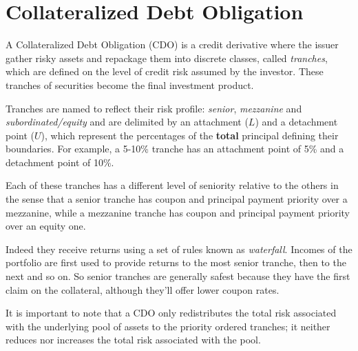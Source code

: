 \section{Collateralized Debt Obligation}\label{collateralized-debt-obligation}

A Collateralized Debt Obligation (CDO) is a credit derivative where the issuer gather risky assets and repackage them into discrete classes, called \emph{tranches}, which are defined on the level of credit risk assumed by the investor. These tranches of securities become the final investment product.

Tranches are named to reflect their risk profile: \emph{senior}, \emph{mezzanine} and \emph{subordinated/equity} and are delimited by an attachment ($L$) and a detachment point ($U$), which represent the percentages of the \textbf{total} principal defining their boundaries. For example, a 5-10\% tranche has an attachment point of 5\% and a detachment point of 10\%. 

Each of these tranches has a different level of seniority relative to the others in the sense that a senior tranche has coupon and principal payment priority over a mezzanine, while a mezzanine tranche has coupon and principal payment priority over an equity one. 

Indeed they receive returns using a set of rules known as \emph{waterfall}. Incomes of the portfolio are first used to provide returns to the most senior tranche, then to the next and so on. So senior tranches are generally safest because they have the first claim on the collateral, although they'll offer lower coupon rates.

It is important to note that a CDO only redistributes the total risk associated with the underlying pool of assets to the priority ordered tranches; it neither reduces nor increases the total risk associated with the pool.

